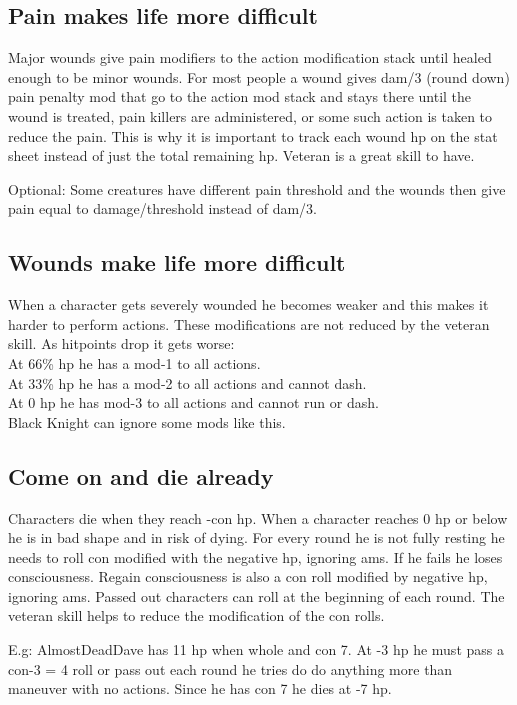 \subsection*{Pain makes life more difficult}
Major wounds give pain modifiers to the action modification stack until healed enough to be minor wounds.
For most people a wound gives dam/3 (round down) pain penalty mod that go to the action mod stack and stays there until the wound is treated, pain killers are administered, or some such action is taken to reduce the pain. This is why it is important to track each wound hp on the stat sheet instead of just the total remaining hp.
Veteran is a great skill to have.

Optional: Some creatures have different pain threshold and the wounds then give pain equal to damage/threshold instead of dam/3.


\subsection*{Wounds make life more difficult}
When a character gets severely wounded he becomes weaker and this makes it harder to perform actions. These modifications are not reduced by the veteran skill. As hitpoints drop it gets worse:\\
At 66\% hp he has a mod-1 to all actions. \\
At 33\% hp he has a mod-2 to all actions and cannot dash. \\
At 0 hp he has mod-3 to all actions and cannot run or dash.\\
Black Knight can ignore some mods like this.


\subsection*{Come on and die already}
Characters die when they reach -con hp. When a character reaches 0 hp or below he is in bad shape and in risk of dying. For every round he is not fully resting he needs to roll con modified with the negative hp, ignoring ams. If he fails he loses consciousness. Regain consciousness is also a con roll modified by negative hp, ignoring ams. Passed out characters can roll at the beginning of each round. The veteran skill helps to reduce the modification of the con rolls.

E.g: AlmostDeadDave has 11 hp when whole and con 7. At -3 hp he must pass a con-3 = 4 roll or pass out each round he tries do do anything more than maneuver with no actions. Since he has con 7 he dies at -7 hp.

